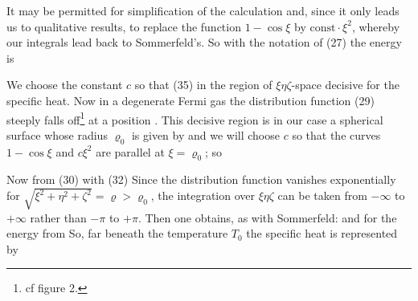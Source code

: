 \begin{paper}{1}
It may be permitted for simplification of the calculation and, since it only leads us to qualitative results, to replace the function $1-\cos\xi$ by $\text{const}\cdot\xi^2$, whereby our integrals lead back to Sommerfeld's. So with the notation of (27) the energy is

We choose the constant $c$ so that (35)  in the region of $\xi\eta\zeta$-space decisive for the specific heat. Now in a degenerate Fermi gas the distribution function (29) steeply falls off\footnote{cf figure 2.} at a position . This decisive region is in our case a spherical surface whose radius $\varrho_0$ is given by
and we will choose $c$ so that the curves $1-\cos\xi$ and $c\xi^2$ are parallel at $\xi=\varrho_0$; so

Now from (30) with (32)
Since the distribution function vanishes exponentially for $\sqrt{\xi^2 + \eta^2 + \zeta^2} = \varrho > \varrho_0$, the integration over $\xi\eta\zeta$ can be taken from $-\infty$ to $+\infty$ rather than $-\pi$ to $+\pi$. Then one obtains, as with Sommerfeld:
and for the energy from
So, far beneath the temperature $T_0$ the specific heat is represented by


\end{paper}
